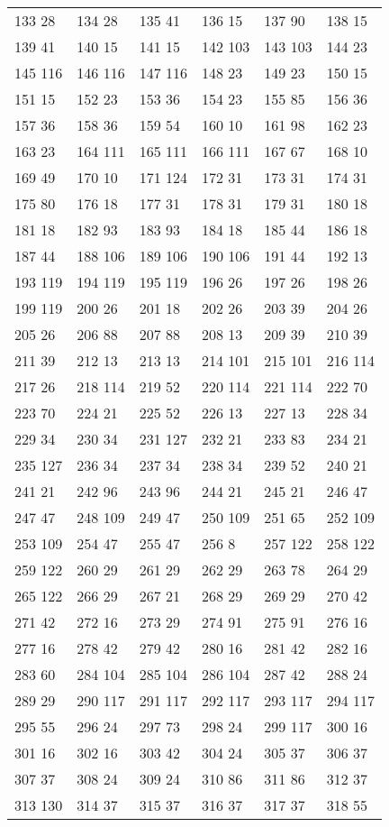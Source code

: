 \begin{longtable}{llllll}
133  28&134 28&135 41&136 15&137 90&138 15\\
139  41&140 15&141 15&142 103&143 103&144 23\\
145  116&146 116&147 116&148 23&149 23&150 15\\
151  15&152 23&153 36&154 23&155 85&156 36\\
157  36&158 36&159 54&160 10&161 98&162 23\\
163  23&164 111&165 111&166 111&167 67&168 10\\
169  49&170 10&171 124&172 31&173 31&174 31\\
175  80&176 18&177 31&178 31&179 31&180 18\\
181  18&182 93&183 93&184 18&185 44&186 18\\
187  44&188 106&189 106&190 106&191 44&192 13\\
193  119&194 119&195 119&196 26&197 26&198 26\\
199  119&200 26&201 18&202 26&203 39&204 26\\
205  26&206 88&207 88&208 13&209 39&210 39\\
211  39&212 13&213 13&214 101&215 101&216 114\\
217  26&218 114&219 52&220 114&221 114&222 70\\
223  70&224 21&225 52&226 13&227 13&228 34\\
229  34&230 34&231 127&232 21&233 83&234 21\\
235  127&236 34&237 34&238 34&239 52&240 21\\
241  21&242 96&243 96&244 21&245 21&246 47\\
247  47&248 109&249 47&250 109&251 65&252 109\\
253  109&254 47&255 47&256 8&257 122&258 122\\
259  122&260 29&261 29&262 29&263 78&264 29\\
265  122&266 29&267 21&268 29&269 29&270 42\\
271  42&272 16&273 29&274 91&275 91&276 16\\
277  16&278 42&279 42&280 16&281 42&282 16\\
283  60&284 104&285 104&286 104&287 42&288 24\\
289  29&290 117&291 117&292 117&293 117&294 117\\
295  55&296 24&297 73&298 24&299 117&300 16\\
301  16&302 16&303 42&304 24&305 37&306 37\\
307  37&308 24&309 24&310 86&311 86&312 37\\
313  130&314 37&315 37&316 37&317 37&318 55\\

\end{longtable}
